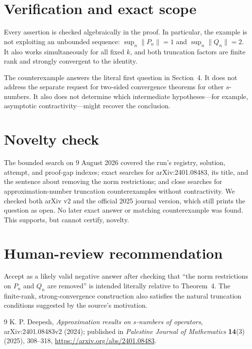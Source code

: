 \documentclass[11pt]{article}
\begin{document}
\section{Verification and exact scope}

Every assertion is checked algebraically in the proof. In particular, the
example is not exploiting an unbounded sequence: $\sup_n\|P_n\|=1$ and
$\sup_n\|Q_n\|=2$. It also works simultaneously for all fixed $k$, and both
truncation factors are finite rank and strongly convergent to the identity.

The counterexample answers the literal first question in Section~4. It does
not address the separate request for two-sided convergence theorems for other
$s$-numbers. It also does not determine which intermediate hypotheses---for
example, asymptotic contractivity---might recover the conclusion.

\section{Novelty check}

The bounded search on 9 August 2026 covered the run's registry, solution,
attempt, and proof-gap indexes; exact searches for arXiv:2401.08483, its title,
and the sentence about removing the norm restrictions; and close searches for
approximation-number truncation counterexamples without contractivity. We
checked both arXiv v2 and the official 2025 journal version, which still prints
the question as open. No later exact answer or matching counterexample was
found. This supports, but cannot certify, novelty.

\section{Human-review recommendation}

Accept as a likely valid negative answer after checking that ``the norm
restrictions on $P_n$ and $Q_n$ are removed'' is intended literally relative
to Theorem~4. The finite-rank, strong-convergence construction also satisfies
the natural truncation conditions suggested by the source's motivation.

\begin{thebibliography}{9}
K. P. Deepesh,
\emph{Approximation results on $s$-numbers of operators},
arXiv:2401.08483v2 (2024); published in \emph{Palestine Journal of
Mathematics} \textbf{14}(3) (2025), 308--318,
\url{https://arxiv.org/abs/2401.08483}.
\end{thebibliography}
\end{document}
